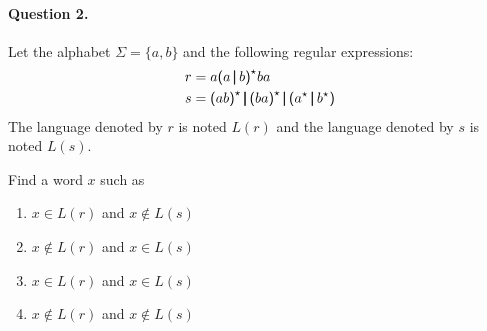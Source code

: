 \paragraph{Question 2.} Let the alphabet \(\Sigma = \{a, b\}\) and the
following regular expressions:
\begin{align*}
    r &= a \textsf{(} a \, \pmb{\lvert}{} \, b \textsf{)}^{\star}{} ba\\
    s &= \textsf{(} ab \textsf{)}^{\star}{} \, \pmb{\lvert}{} \, \textsf{(} ba
    \textsf{)}^{\star}{} \, \pmb{\lvert}{} \, \textsf{(} a^{\star}{}
    \, \pmb{\lvert}{} \, b^{\star}\textsf{)}
\end{align*}
The language denoted by \(r\) is noted \(L(r)\) and the language
denoted by \(s\) is noted \(L(s)\).

\bigskip

\noindent Find a word \(x\) such as
\begin{enumerate}

  \item \(x \in L(r)\) and \(x \not\in L(s)\)

  \item \(x \not\in L(r)\) and \(x \in L(s)\)

  \item \(x \in L(r)\) and \(x \in L(s)\)

  \item \(x \not\in L(r)\) and \(x \not\in L(s)\)

\end{enumerate}
